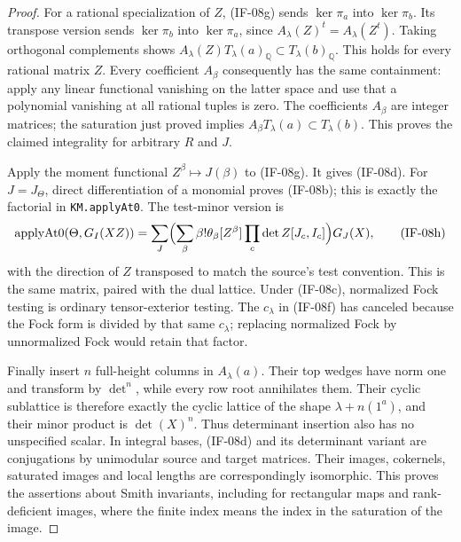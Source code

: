 \documentclass[11pt,a4paper]{article}
\theoremstyle{definition}
\theoremstyle{remark}
\begin{document}
\begin{proof}
For a rational specialization of $Z$, (IF-08g) sends $\ker\pi_a$
into $\ker\pi_b$. Its transpose version sends $\ker\pi_b$ into
$\ker\pi_a$, since $A_\lambda(Z)^t=A_\lambda(Z^t)$.
Taking orthogonal complements shows
$A_\lambda(Z)T_\lambda(a)_\mathbb Q\subset
T_\lambda(b)_\mathbb Q$. This holds for every rational matrix $Z$.
Every coefficient $A_\beta$ consequently has the same containment:
apply any linear functional vanishing on the latter space and use
that a polynomial vanishing at all rational tuples is zero.
The coefficients $A_\beta$ are integer matrices; the saturation just
proved implies $A_\beta T_\lambda(a)\subset T_\lambda(b)$.
This proves the claimed integrality for arbitrary $R$ and $J$.

Apply the moment functional $Z^\beta\mapsto J(\beta)$ to (IF-08g).
It gives (IF-08d). For $J=J_\Theta$, direct differentiation of a
monomial proves (IF-08b); this is exactly the factorial in
\texttt{KM.applyAt0}. The test-minor version is
\[
 \operatorname{applyAt0}(\Theta,G_I(XZ))
   =\sum_J \Bigl(\sum_\beta\beta!\theta_\beta
                [Z^\beta]\prod_c\det Z[J_c,I_c]\Bigr)G_J(X),
                                                               \tag{IF-08h}
\]
with the direction of $Z$ transposed to match the source's test
convention. This is the same matrix, paired with the dual lattice.
Under (IF-08c), normalized Fock testing is ordinary tensor-exterior
testing. The $c_\lambda$ in (IF-08f) has canceled because the Fock
form is divided by that same $c_\lambda$; replacing normalized Fock
by unnormalized Fock would retain that factor.

Finally insert $n$ full-height columns in $A_\lambda(a)$. Their top
wedges have norm one and transform by $\det^n$, while every row root
annihilates them. Their cyclic sublattice is therefore exactly the
cyclic lattice of the shape $\lambda+n(1^a)$, and their minor product
is $\det(X)^n$. Thus determinant insertion also has no unspecified
scalar. In integral bases, (IF-08d) and its determinant variant are
conjugations by unimodular source and target matrices. Their images,
cokernels, saturated images and local lengths are correspondingly
isomorphic. This proves the assertions about Smith invariants,
including for rectangular maps and rank-deficient images, where the
finite index means the index in the saturation of the image.
\end{proof}
\end{document}
